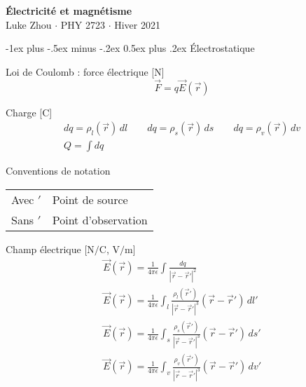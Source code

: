 \documentclass[10pt,landscape]{article}
\makeatletter
\renewcommand{\section}{\@startsection{section}{1}{0mm}%
                                {-1ex plus -.5ex minus -.2ex}%
                                {0.5ex plus .2ex}%
                                {\normalfont\large\bfseries}}
\newcommand{\extraline}{\vspace{1em}}
\newcommand{\halfline}{\vspace{0.5em}}
\newcommand{\tableindent}{\hspace{1.5em}}
\newcommand{\uvec}[1]{\ensuremath{\boldsymbol{\hat{#1}}}}
\makeatother
\begin{document}
\raggedright
\footnotesize
\begin{multicols}{3}

\setlength{\premulticols}{1pt}
\setlength{\postmulticols}{1pt}
\setlength{\multicolsep}{1pt}
\setlength{\columnsep}{2pt}

\begin{center}
     \Large{\textbf{Électricité et magnétisme}} \\
     \small{Luke Zhou $\cdot$ PHY 2723 $\cdot$ Hiver 2021}
\end{center}

\section{Électrostatique}

Loi de Coulomb : force électrique [\si{\newton}]
 \[ \vec{F} = q\vec{E}(\vec{r}) \] %

Charge  [\si{\coulomb}]
\begin{gather*} 
dq = \rho_l(\vec{r}) \,dl  \qquad  dq = \rho_s(\vec{r}) \,ds  \qquad dq = \rho_v(\vec{r}) \,dv  \\
 \textstyle Q = \int dq 
\end{gather*}

Conventions de notation  \\
\halfline
\begin{tabular}{@{\tableindent}ll@{}}
	Avec $'$ & Point de source\\
	Sans $'$ & Point d'observation \\
\end{tabular}

\extraline
Champ électrique [$\si{\newton/\coulomb}$, $\si{\volt/\metre}$]
\begin{gather*}
\vec{E}(\vec{r}) = \frac{1}{4\pi\epsilon} \int \frac{dq}{| \vec{r} - \vec{r}' |^2 }  \\
%
 \vec{E}(\vec{r}) = \frac{1}{4\pi\epsilon} \int_{l} \frac{\rho_l(\vec{r}')}{| \vec{r} - \vec{r}' |^3 } (\vec{r} - \vec{r}' )\,dl'  \\
%
\vec{E}(\vec{r}) = \frac{1}{4\pi\epsilon} \int_{s} \frac{\rho_s(\vec{r}')}{| \vec{r} - \vec{r}'|^3 } (\vec{r} - \vec{r}' )\,ds' \\
%
\vec{E}(\vec{r}) = \frac{1}{4\pi\epsilon} \int_{v} \frac{\rho_v(\vec{r}')}{| \vec{r} - \vec{r}' |^3 } (\vec{r} - \vec{r}' )\,dv'  
\end{gather*}
	

\end{multicols}
\end{document}
